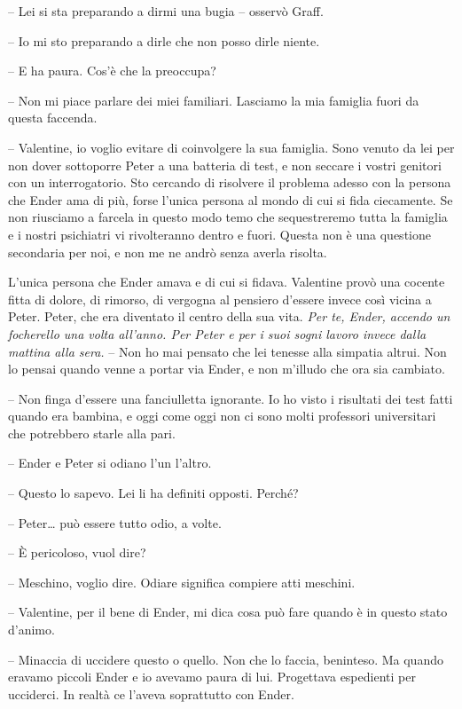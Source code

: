 {-- Lei si sta preparando a dirmi una bugia -- osservò Graff.}

{-- Io mi sto preparando a dirle che non posso dirle niente.}

{-- E ha paura. Cos'è che la preoccupa?}

{-- Non mi piace parlare dei miei familiari. Lasciamo la mia famiglia
	fuori da questa faccenda.}

{-- Valentine, io voglio evitare di coinvolgere la sua famiglia. Sono
	venuto da lei per non dover sottoporre Peter a una batteria di test, e
	non seccare i vostri genitori con un interrogatorio. Sto cercando di
	risolvere il problema adesso con la persona che Ender ama di più, forse
	l'unica persona al mondo di cui si fida ciecamente. Se non riusciamo a
	farcela in questo modo temo che sequestreremo tutta la famiglia e i
	nostri psichiatri vi rivolteranno dentro e fuori. Questa non è una
	questione secondaria per noi, e non me ne andrò senza averla risolta.}

{L'unica persona che Ender amava e di cui si fidava. Valentine provò una
	cocente fitta di dolore, di rimorso, di vergogna al pensiero d'essere
	invece così vicina a Peter. Peter, che era diventato il centro della sua
	vita. \emph{Per te, Ender, accendo un focherello una volta all'anno. Per
		Peter e per i suoi sogni lavoro invece dalla mattina alla sera.} -- Non
	ho mai pensato che lei tenesse alla simpatia altrui. Non lo pensai
	quando venne a portar via Ender, e non m'illudo che ora sia cambiato.}

{-- Non finga d'essere una fanciulletta ignorante. Io ho visto i
	risultati dei test fatti quando era bambina, e oggi come oggi non ci
	sono molti professori universitari che potrebbero starle alla pari.}

{-- Ender e Peter si odiano l'un l'altro.}

{-- Questo lo sapevo. Lei li ha definiti opposti. Perché?}

{-- Peter\ldots{} può essere tutto odio, a volte.}

{-- È pericoloso, vuol dire?}

{-- Meschino, voglio dire. Odiare significa compiere atti meschini.}

{-- Valentine, per il bene di Ender, mi dica cosa può fare quando è in
	questo stato d'animo.}

{-- Minaccia di uccidere questo o quello. Non che lo faccia, beninteso.
	Ma quando eravamo piccoli Ender e io avevamo paura di lui. Progettava
	espedienti per ucciderci. In realtà ce l'aveva soprattutto con Ender.}

